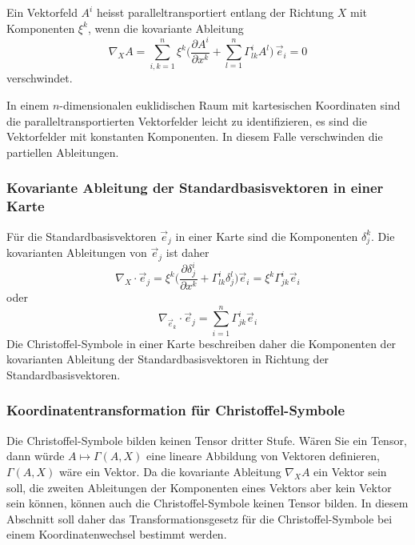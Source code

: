 \begin{definition}
Ein Vektorfeld $A^i$ heisst paralleltransportiert entlang der Richtung
$X$ mit Komponenten $\xi^k$, wenn die kovariante Ableitung
\begin{equation*}
\nabla_X A
=
\sum_{i,k=1}^n
\xi^k
\biggl(
\frac{\partial A^i}{\partial x^k}
+
\sum_{l=1}^n
\Gamma^i_{lk} A^l
\biggr)
\,\vec{e}_i
= 0
\end{equation*}
verschwindet.
\end{definition}

In einem $n$-dimensionalen euklidischen Raum mit kartesischen Koordinaten
sind die paralleltransportierten Vektorfelder leicht zu identifizieren,
es sind die Vektorfelder mit konstanten Komponenten.
In diesem Falle verschwinden die partiellen Ableitungen.

%
%
\subsubsection{Kovariante Ableitung der Standardbasisvektoren in einer Karte}
Für die Standardbasisvektoren $\vec{e}_j$ in einer Karte sind die
Komponenten $\delta_j^k$.
Die kovarianten Ableitungen von $\vec{e}_j$ ist daher
\begin{equation}
\nabla_X\cdot \vec{e}_j
=
\xi^k
\biggl(
\frac{\partial \delta_j^i}{\partial x^k}
+
\Gamma^i_{lk}
\delta_j^l
\biggr)
\vec{e}_i
=
\xi^k\Gamma^i_{jk}\vec{e}_i
\label{buch:zusammenhang:paralleltransport:kovabl:eqn:kontravektor}
\end{equation}
oder
\begin{equation}
\nabla_{\vec{e}_k}\cdot \vec{e}_j
=
\sum_{i=1}^n
\Gamma^i_{jk}\vec{e}_i
\label{buch:zusammenhang:paralleltransport:kovabl:eqn:kontrabasis}
\end{equation}
Die Christoffel-Symbole in einer Karte beschreiben daher die Komponenten
der kovarianten Ableitung der Standardbasisvektoren in Richtung
der Standardbasisvektoren.
%
%
\subsubsection{Koordinatentransformation für Christoffel-Symbole}
Die Christoffel-Symbole bilden keinen Tensor dritter Stufe.
Wären Sie ein Tensor, dann würde $A\mapsto \Gamma(A,X)$ eine lineare
Abbildung von Vektoren definieren, $\Gamma(A,X)$ wäre ein Vektor.
Da die kovariante Ableitung $\nabla_XA$ ein Vektor sein soll,
die zweiten Ableitungen der Komponenten eines Vektors aber kein Vektor
sein können, können auch die Christoffel-Symbole keinen Tensor bilden.
In diesem Abschnitt soll daher das Transformationsgesetz für die
Christoffel-Symbole bei einem Koordinatenwechsel bestimmt werden.

